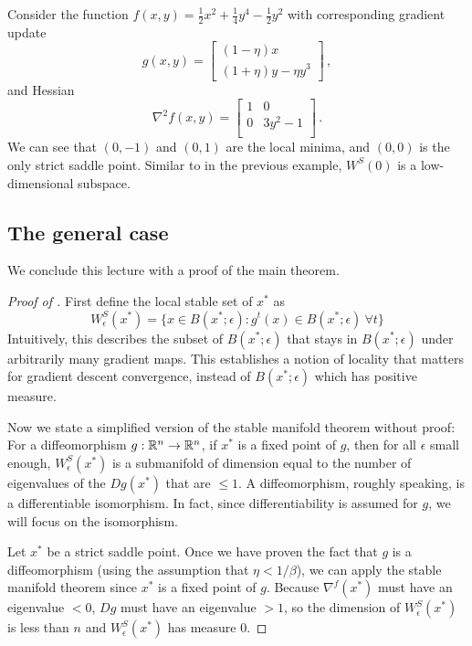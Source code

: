 \begin{example}
Consider the function 
$f(x,y) = \frac{1}{2}x^2 + \frac{1}{4}y^4 - \frac{1}{2}y^2$  with corresponding
gradient update 
\[
g(x,y) = 
\begin{bmatrix}
(1-\eta)x\\
(1+\eta)y - \eta y^3 
\end{bmatrix}\,,
\]
and Hessian
\[
\nabla^2 f(x,y) = 
 \begin{bmatrix}
1 & 0 \\
0 & 3y^2-1 \\
\end{bmatrix}\,.
\]
We can see that $(0,-1)$ and $(0,1)$ are the local minima, and $(0,0)$ is the only strict saddle point. Similar to in the previous example, $W^S(0)$ is a low-dimensional subspace. 

\subsection{The general case}

We conclude this lecture with a proof of the main theorem.

\begin{proof}[Proof of ]
First define the local stable set of $x^*$ as
$$
W^S_\epsilon(x^*) 
= \{ x\in B(x^*;\epsilon): g^t(x)\in B(x^*;\epsilon) ~\forall t \}
$$
Intuitively, this describes the subset of $B(x^*;\epsilon)$ that stays in $B(x^*;\epsilon)$ under arbitrarily many gradient maps. This establishes a notion of locality that matters for gradient descent convergence, instead of $B(x^*;\epsilon)$ which has positive measure.

Now we state a simplified version of the stable manifold theorem without proof: For a diffeomorphism $g:\mathbb{R}^n\rightarrow\mathbb{R}^n$, if $x^*$ is a fixed point of $g$, then for all $\epsilon$ small enough, $W^S_\epsilon(x^*)$ is a submanifold of dimension equal to the number of eigenvalues of the $Dg(x^*)$ that are $\leq 1$. A diffeomorphism, roughly speaking, is a differentiable isomorphism. In fact, since differentiability is assumed for $g$, we will focus on the isomorphism.

Let $x^*$ be a strict saddle point.
Once we have proven the fact that $g$ is a diffeomorphism (using the assumption that $\eta<1/\beta$), we can apply the stable manifold theorem since $x^*$ is a fixed point of $g$. 
Because $\nabla^f (x^*)$ must have an eigenvalue $<0$, $Dg$ must have an eigenvalue $>1$, so 
the dimension of $W^S_\epsilon(x^*)$ is less than $n$ and $W^S_\epsilon(x^*)$ has measure 0. 


\end{proof}
\end{example}
